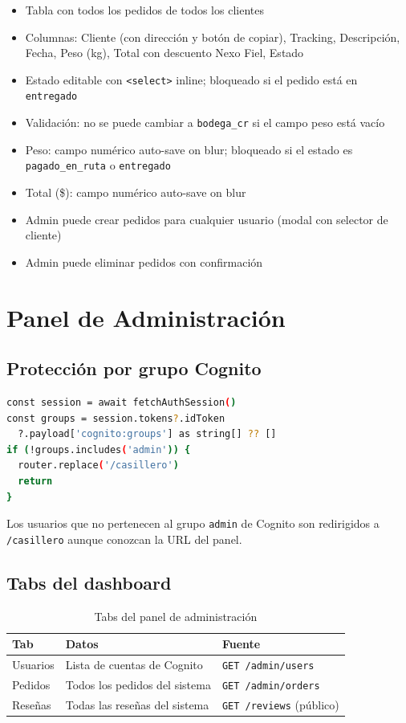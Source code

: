 \documentclass[12pt,a4paper]{article}
\begin{document}
\begin{itemize}
  \item Tabla con todos los pedidos de todos los clientes
  \item Columnas: Cliente (con dirección y botón de copiar), Tracking, Descripción, Fecha, Peso (kg), Total con descuento Nexo Fiel, Estado
  \item Estado editable con \texttt{<select>} inline; bloqueado si el pedido está en \texttt{entregado}
  \item Validación: no se puede cambiar a \texttt{bodega\_cr} si el campo peso está vacío
  \item Peso: campo numérico auto-save on blur; bloqueado si el estado es \texttt{pagado\_en\_ruta} o \texttt{entregado}
  \item Total (\$): campo numérico auto-save on blur
  \item Admin puede crear pedidos para cualquier usuario (modal con selector de cliente)
  \item Admin puede eliminar pedidos con confirmación
\end{itemize}

\section{Panel de Administración}

\subsection{Protección por grupo Cognito}

\begin{lstlisting}[language=bash, caption={Verificacion de rol admin en /admin/page.tsx}]
const session = await fetchAuthSession()
const groups = session.tokens?.idToken
  ?.payload['cognito:groups'] as string[] ?? []
if (!groups.includes('admin')) {
  router.replace('/casillero')
  return
}
\end{lstlisting}

Los usuarios que no pertenecen al grupo \texttt{admin} de Cognito son redirigidos
a \texttt{/casillero} aunque conozcan la URL del panel.

\subsection{Tabs del dashboard}

\begin{table}[H]
\centering
\begin{tabular}{@{}lll@{}}
\toprule
\textbf{Tab} & \textbf{Datos} & \textbf{Fuente} \\
\midrule
Usuarios & Lista de cuentas de Cognito & \texttt{GET /admin/users} \\
Pedidos & Todos los pedidos del sistema & \texttt{GET /admin/orders} \\
Reseñas & Todas las reseñas del sistema & \texttt{GET /reviews} (público) \\
\bottomrule
\end{tabular}
\caption{Tabs del panel de administración}
\end{table}
\end{document}
